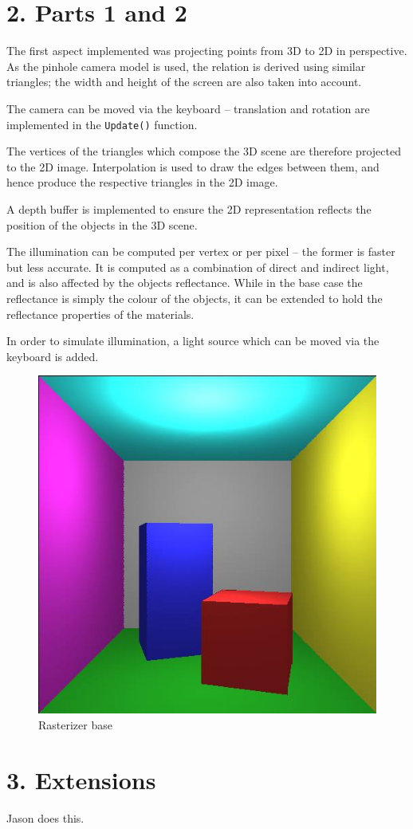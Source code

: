 \documentclass[DIV=calc, paper=a4, fontsize=11pt, twocolumn]{article}	 %
\begin{document}
	\section*{2. Parts 1 and 2}
	The first aspect implemented was projecting points from 3D to 2D in perspective. As the pinhole camera model is used, the relation is derived using similar triangles; the width and height of the screen are also taken into account.
	\par
	The camera can be moved via the keyboard -- translation and rotation are implemented in the \texttt{Update()} function.
	\par
	The vertices of the triangles which compose the 3D scene are therefore projected to the 2D image. Interpolation is used to draw the edges between them, and hence produce the respective triangles in the 2D image.
	\par
	A depth buffer is implemented to ensure the 2D representation reflects the position of the objects in the 3D scene.
	\par
	The illumination can be computed per vertex or per pixel -- the former is faster but less accurate. It is computed as a combination of direct and indirect light, and is also affected by the objects reflectance. While in the base case the reflectance is simply the colour of the objects, it can be extended to hold the reflectance properties of the materials.
	\par
	In order to simulate illumination, a light source which can be moved via the keyboard is added.
	\begin{figure}[!htp]
		\begin{minipage}{.95\linewidth}
			\includegraphics[width=\linewidth]{rast_base.jpg}
			\captionsetup{belowskip=4pt,aboveskip=-11pt}
			\caption{Rasterizer base}
			\label{graph}
		\end{minipage}
	\end{figure}
	
	\section*{3. Extensions}
	Jason does this.

	
\end{document}
